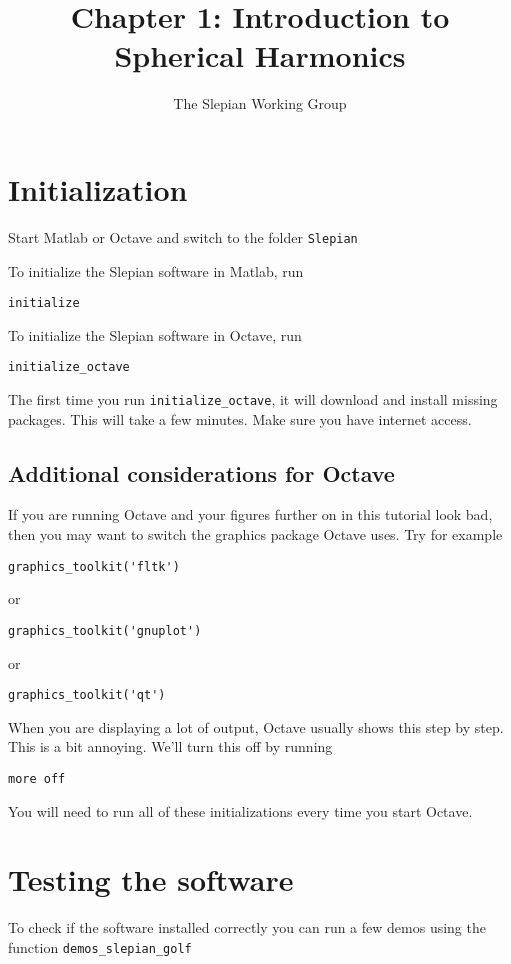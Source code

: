\documentclass[11pt]{article}
\title{Chapter 1: Introduction to Spherical Harmonics}
\author{The Slepian Working Group}
\begin{document}
\maketitle

\section{Initialization}

Start Matlab or Octave and switch to the folder \verb+Slepian+

To initialize the Slepian software in Matlab, run

\qquad \verb+initialize+

To initialize the Slepian software in Octave, run

\qquad \verb+initialize_octave+

The first time you run \verb+initialize_octave+, it will download and install
missing packages. This will take a few minutes. Make sure you have
internet access. 

\subsection{Additional considerations for Octave}

If you are running Octave and your figures further on in this tutorial
look bad, then you may want to switch the graphics package Octave
uses. Try for example

\qquad \verb+graphics_toolkit('fltk')+

or

\qquad \verb+graphics_toolkit('gnuplot')+

or

\qquad \verb+graphics_toolkit('qt')+

When you are displaying a lot of output, Octave usually shows this
step by step. This is a bit annoying. We'll turn this off by running

\qquad \verb+more off+

You will need to run all of these initializations every time you start
Octave.



\section{Testing the software}\label{testing}
To check if the software installed correctly you can run a few demos
using the function \verb+demos_slepian_golf+
\end{document}
